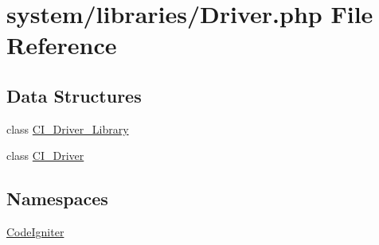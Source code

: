 \hypertarget{_driver_8php}{}\section{system/libraries/\+Driver.php File Reference}
\label{_driver_8php}
\subsection*{Data Structures}
\begin{DoxyCompactItemize}
\item 
class \mbox{\hyperlink{class_c_i___driver___library}{C\+I\+\_\+\+Driver\+\_\+\+Library}}
\item 
class \mbox{\hyperlink{class_c_i___driver}{C\+I\+\_\+\+Driver}}
\end{DoxyCompactItemize}
\subsection*{Namespaces}
\begin{DoxyCompactItemize}
\item 
 \mbox{\hyperlink{namespace_code_igniter}{Code\+Igniter}}
\end{DoxyCompactItemize}
